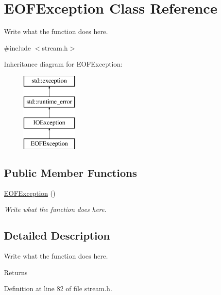 \hypertarget{classEOFException}{\section{E\+O\+F\+Exception Class Reference}
\label{classEOFException}
}


Write what the function does here.  




{\ttfamily \#include $<$stream.\+h$>$}

Inheritance diagram for E\+O\+F\+Exception\+:\begin{figure}[H]
\begin{center}
\leavevmode
\includegraphics[height=4.000000cm]{classEOFException}
\end{center}
\end{figure}
\subsection*{Public Member Functions}
\begin{DoxyCompactItemize}
\item 
\hyperlink{classEOFException_a3c5edac67815fe76fb7137f3a8eeb2c8}{E\+O\+F\+Exception} ()
\begin{DoxyCompactList}\small\item\em Write what the function does here. \end{DoxyCompactList}\end{DoxyCompactItemize}


\subsection{Detailed Description}
Write what the function does here. 

\begin{DoxyReturn}{Returns}

\end{DoxyReturn}


Definition at line 82 of file stream.\+h.




